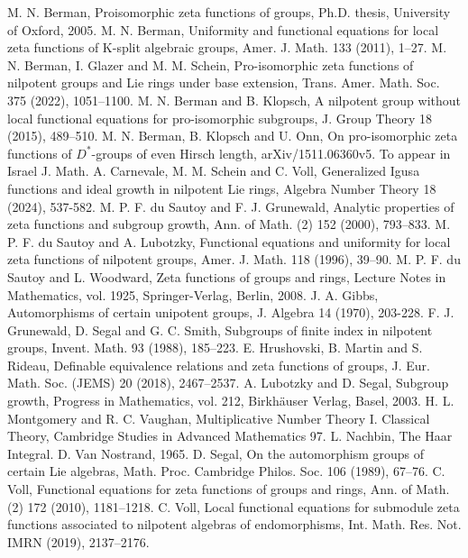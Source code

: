 \documentclass[12pt]{article}
\begin{document}
\begin{thebibliography}{2}
 M. N. Berman,
Proisomorphic zeta functions of groups, Ph.D. thesis, University of Oxford,
2005.
M. N. Berman,
Uniformity and functional equations for local zeta functions of
K-split
algebraic groups, Amer. J. Math.
133
(2011), 1–27.
 M. N. Berman, I. Glazer and M. M. Schein, Pro-isomorphic zeta functions of nilpotent groups and Lie rings under base extension, Trans. Amer. Math. Soc. 375 (2022), 1051–1100.
M. N. Berman and B. Klopsch,
A nilpotent group without local functional equations
for pro-isomorphic subgroups, J. Group Theory
18
(2015), 489–510.
 M. N. Berman, B. Klopsch and U. Onn,
On pro-isomorphic zeta functions of $D^{\ast}$-groups of even Hirsch length, arXiv/1511.06360v5. To appear in Israel J. Math.
 A. Carnevale, M. M. Schein and C. Voll, Generalized Igusa functions and
 ideal growth in nilpotent Lie rings, Algebra Number Theory 18 (2024), 537-582.
M. P. F. du Sautoy and F. J. Grunewald,
Analytic properties of zeta functions and subgroup
growth, Ann. of Math. (2)
152
(2000), 793–833.
 M. P. F. du Sautoy and A. Lubotzky, Functional equations and uniformity for
local zeta functions of nilpotent groups, Amer. J. Math. 118 (1996), 39–90.
M. P. F. du Sautoy and L. Woodward,
Zeta functions of groups and rings, Lecture Notes
in Mathematics, vol. 1925, Springer-Verlag, Berlin, 2008.
 J. A. Gibbs, Automorphisms of certain unipotent groups, J. Algebra 14 (1970), 203-228.
 F. J. Grunewald, D. Segal and G. C. Smith, Subgroups of finite index in nilpotent groups,
Invent. Math. 93 (1988), 185–223.
 E. Hrushovski, B. Martin and S. Rideau,
Definable equivalence relations and
zeta functions of groups, J. Eur. Math. Soc. (JEMS)
20
(2018), 2467–2537. 
A. Lubotzky and D. Segal, Subgroup growth, Progress in Mathematics, vol. 212,
 Birkhäuser Verlag, Basel, 2003.
 H. L. Montgomery and R. C. Vaughan, Multiplicative Number Theory I. Classical Theory, Cambridge Studies in Advanced Mathematics 97.
L. Nachbin, The Haar Integral. D. Van Nostrand, 1965.
 D. Segal, On the automorphism groups of certain Lie algebras, Math. Proc. Cambridge
 Philos. Soc. 106 (1989), 67–76.
 C. Voll,
Functional equations for zeta
functions of groups and rings, Ann. of Math.
(2)
172
(2010), 1181–1218.
C. Voll, Local functional equations for submodule zeta functions associated to nilpotent
algebras of endomorphisms, Int. Math. Res. Not. IMRN (2019), 2137–2176.
\end{thebibliography}
\end{document}
